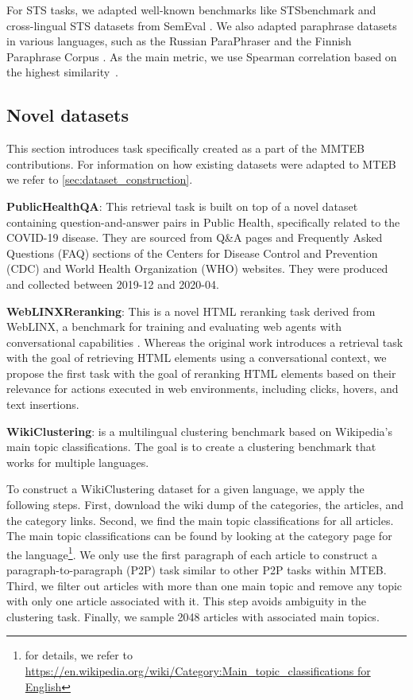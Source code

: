 For STS tasks, we adapted well-known benchmarks like STSbenchmark \citep{may2024stsb} and cross-lingual STS datasets from SemEval \citep{agirre2015semeval}. We also adapted paraphrase datasets in various languages, such as the Russian ParaPhraser \citep{pivovarova2017paraphraser} and the Finnish Paraphrase Corpus \citep{kanerva-etal-2021-finnish}. As the main metric, we use Spearman correlation based on the highest similarity~\citep{reimers-etal-2016-task}.


\subsection{Novel datasets}
\label{sec:newds}

This section introduces task specifically created as a part of the MMTEB contributions. For information on how existing datasets were adapted to MTEB we refer to \autoref{sec:dataset_construction}.

\textbf{PublicHealthQA}: This retrieval task is built on top of a novel dataset containing question-and-answer pairs in Public Health, specifically related to the COVID-19 disease. They are sourced from Q\&A pages and Frequently Asked Questions (FAQ) sections of the Centers for Disease Control and Prevention (CDC) and World Health Organization (WHO) websites. They were produced and collected between 2019-12 and 2020-04.

\textbf{WebLINXReranking}: This is a novel HTML reranking task derived from WebLINX, a benchmark for training and evaluating web agents with conversational capabilities \citep{lù2024weblinx}. Whereas the original work introduces a retrieval task with the goal of retrieving HTML elements using a conversational context, we propose the first task with the goal of reranking HTML elements based on their relevance for actions executed in web environments, including clicks, hovers, and text insertions.

\textbf{WikiClustering}: is a multilingual clustering benchmark based on Wikipedia's main topic classifications. The goal is to create a clustering benchmark that works for multiple languages.

To construct a WikiClustering dataset for a given language, we apply the following steps. First, download the wiki dump of the categories, the articles, and the category links. Second, we find the main topic classifications for all articles. The main topic classifications can be found by looking at the category page for the language\footnote{for details, we refer to \url{https://en.wikipedia.org/wiki/Category:Main_topic_classifications for English}}. We only use the first paragraph of each article to construct a paragraph-to-paragraph (P2P) task similar to other P2P tasks within MTEB. Third, we filter out articles with more than one main topic and remove any topic with only one article associated with it. This step avoids ambiguity in the clustering task. Finally, we sample 2048 articles with associated main topics. 

